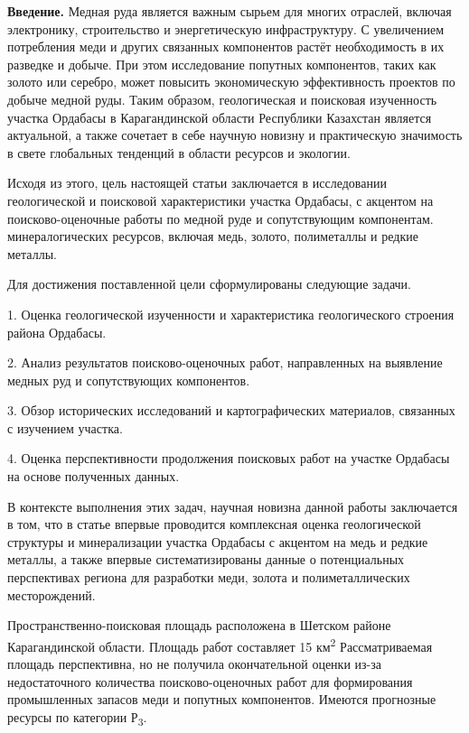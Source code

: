 \begin{multicols}{2}
{\bfseries Введение.} Медная руда является важным сырьем для многих
отраслей, включая электронику, строительство и энергетическую
инфраструктуру. С увеличением потребления меди и других связанных
компонентов растёт необходимость в их разведке и добыче. При этом
исследование попутных компонентов, таких как золото или серебро, может
повысить экономическую эффективность проектов по добыче медной руды.
Таким образом, геологическая и поисковая изученность участка Ордабасы в
Карагандинской области Республики Казахстан является актуальной, а также
сочетает в себе научную новизну и практическую значимость в свете
глобальных тенденций в области ресурсов и экологии.

Исходя из этого, цель настоящей статьи заключается в исследовании
геологической и поисковой характеристики участка Ордабасы, с акцентом на
поисково-оценочные работы по медной руде и сопутствующим компонентам.
минералогических ресурсов, включая медь, золото, полиметаллы и редкие
металлы.

Для достижения поставленной цели сформулированы следующие задачи.

1. Оценка геологической изученности и характеристика геологического
строения района Ордабасы.

2. Анализ результатов поисково-оценочных работ, направленных на выявление
медных руд и сопутствующих компонентов.

3. Обзор исторических исследований и картографических материалов,
связанных с изучением участка.

4. Оценка перспективности продолжения поисковых работ на участке Ордабасы
на основе полученных данных.

В контексте выполнения этих задач, научная новизна данной работы
заключается в том, что в статье впервые проводится комплексная оценка
геологической структуры и минерализации участка Ордабасы с акцентом на
медь и редкие металлы, а также впервые систематизированы данные о
потенциальных перспективах региона для разработки меди, золота и
полиметаллических месторождений.

Пространственно-поисковая площадь расположена в Шетском районе
Карагандинской области. Площадь работ составляет 15
км\textsuperscript{2} Рассматриваемая площадь перспективна, но не
получила окончательной оценки из-за недостаточного количества
поисково-оценочных работ для формирования промышленных запасов меди и
попутных компонентов. Имеются прогнозные ресурсы по категории
Р\textsubscript{3}.


\end{multicols}
